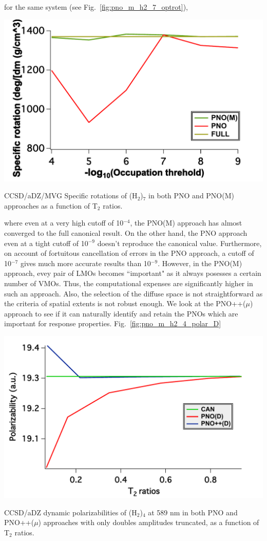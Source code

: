 for the same system (see Fig.~\ref{fig:pno_m_h2_7_optrot}),
\begin{MyFigure}[h!]
\centering
\includegraphics[width=0.6\linewidth,natwidth=610,natheight=642]{figures_pno++/pno_m_h2_7_adz_optrot.pdf}
\caption{{\footnotesize CCSD/aDZ/MVG Specific rotations of (H$_2$)$_7$ in both PNO and PNO(M) approaches
as a function of T$_2$ ratios.}}
\label{fig:pno_m_h2_7_optrot}
\end{MyFigure}
where even at a very high cutoff of 10$^{-4}$, the PNO(M) approach has almost converged to the full 
canonical result. On the other hand, the PNO approach even at a tight cutoff of 10$^{-9}$ doesn't
reproduce the canonical value. Furthermore, on account of fortuitous cancellation of errors in the
PNO approach, a cutoff of 10$^{-7}$ gives much more accurate results than 10$^{-9}$.
However, in the PNO(M) approach, evey pair of LMOs becomes ``important" as it always posesses 
a certain number of VMOs. Thus, the computational expenses are significantly higher in such an
approach. Also, the selection of the diffuse space is not straightforward as the criteria of 
spatial extents is not robust enough. We look at the PNO++($\mu$) approach to see if it can naturally
identify and retain the PNOs which are important for response properties.
Fig.~\ref{fig:pno_m_h2_4_polar_D}
\begin{MyFigure}[h!]
\centering
\includegraphics[width=0.6\linewidth,natwidth=610,natheight=642]{figures_pno++/h2_4_polar_D.pdf}
\caption{{\footnotesize CCSD/aDZ dynamic polarizabilities of (H$_2$)$_4$ at 589 nm in both PNO and PNO++($\mu$) approaches
with only doubles amplitudes truncated, as a function of T$_2$ ratios.}}
\label{fig:pno_m_h2_4_polar_D}
\end{MyFigure}
